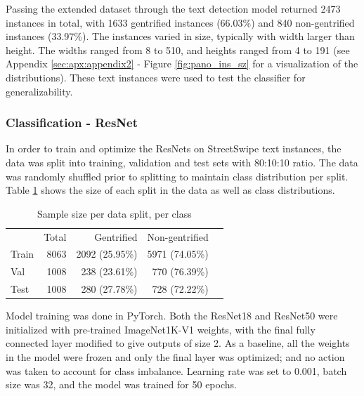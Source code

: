 Passing the extended dataset through the text detection model returned 2473 instances in total, with 1633 gentrified instances (66.03\%) and 840 non-gentrified instances (33.97\%). The instances varied in size, typically with width larger than height. The widths ranged from 8 to 510, and heights ranged from 4 to 191 (see Appendix \ref{sec:apx:appendix2} - Figure \ref{fig:pano_ins_sz} for a visualization of the distributions). These text instances were used to test the classifier for generalizability.


\subsubsection{Classification - ResNet}

In order to train and optimize the ResNets on StreetSwipe text instances, the data was split into training, validation and test sets with 80:10:10 ratio. The data was randomly shuffled prior to splitting to maintain class distribution per split. Table \ref{tab:data_split} shows the size of each split in the data as well as class distributions.

{
\setlength\intextsep{0pt}
\begin{table}
    \begin{tabular}{lrrrl}
    \toprule
            & \multicolumn{1}{r}{Total} &\multicolumn{1}{r}{Gentrified} & \multicolumn{1}{r}{Non-gentrified} \\ \cline{1-4}
Train       & 8063                      & 2092 (25.95\%)                & 5971 (74.05\%)      \\
Val         & 1008                      & 238 (23.61\%)                 & 770 (76.39\%)       \\
Test        & 1008                      & 280 (27.78\%)                 & 728 (72.22\%)       \\
    \bottomrule
    \end{tabular}
    \caption{Sample size per data split, per class}
    \label{tab:data_split}
\vspace{-10pt}
\end{table}
}

Model training was done in PyTorch. Both the ResNet18 and ResNet50 were initialized with pre-trained ImageNet1K-V1 weights, with the final fully connected layer modified to give outputs of size 2. As a baseline, all the weights in the model were frozen and only the final layer was optimized; and no action was taken to account for class imbalance. Learning rate was set to 0.001, batch size was 32, and the model was trained for 50 epochs.

